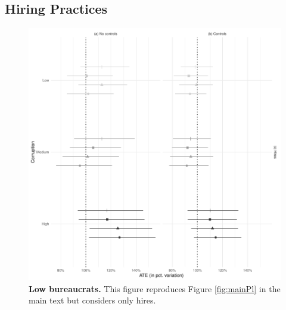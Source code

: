\documentclass[12pt,a4paper]{article}
\theoremstyle{definition}
\begin{document}
{\subsection{Hiring Practices}
\label{app:hiring}
\begin{figure}[H]
    \centering
    \includegraphics{figures/mainPlHires.pdf}
    \caption{{\bf Low bureaucrats.} This figure reproduces Figure \ref{fig:mainPl} in the main text but considers only hires.}
    \label{fig:plHires}
\end{figure}

}
\end{document}
